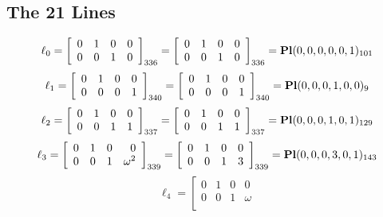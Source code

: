\documentclass{article}
\begin{document}
{\subsection*{The 21 Lines}
$$
\ell_{0} = 
\left[
\begin{array}{*{4}{r}}
0 & 1 & 0 & 0\\
0 & 0 & 1 & 0\\
\end{array}
\right]
_{336}
=
\left[
\begin{array}{*{4}c}
0  & 1  & 0  & 0\\
0  & 0  & 1  & 0\\
\end{array}
\right]_{336}
={\rm\bf Pl}(0,0,0,0,0,1 )_{101}$$
$$
\ell_{1} = 
\left[
\begin{array}{*{4}{r}}
0 & 1 & 0 & 0\\
0 & 0 & 0 & 1\\
\end{array}
\right]
_{340}
=
\left[
\begin{array}{*{4}c}
0  & 1  & 0  & 0\\
0  & 0  & 0  & 1\\
\end{array}
\right]_{340}
={\rm\bf Pl}(0,0,0,1,0,0 )_{9}$$
$$
\ell_{2} = 
\left[
\begin{array}{*{4}{r}}
0 & 1 & 0 & 0\\
0 & 0 & 1 & 1\\
\end{array}
\right]
_{337}
=
\left[
\begin{array}{*{4}c}
0  & 1  & 0  & 0\\
0  & 0  & 1  & 1\\
\end{array}
\right]_{337}
={\rm\bf Pl}(0,0,0,1,0,1 )_{129}$$
$$
\ell_{3} = 
\left[
\begin{array}{*{4}{r}}
0 & 1 & 0 & 0\\
0 & 0 & 1 & \omega^{2}\\
\end{array}
\right]
_{339}
=
\left[
\begin{array}{*{4}c}
0  & 1  & 0  & 0\\
0  & 0  & 1  & 3\\
\end{array}
\right]_{339}
={\rm\bf Pl}(0,0,0,3,0,1 )_{143}$$
$$
\ell_{4} = 
\left[
\begin{array}{*{4}{r}}
0 & 1 & 0 & 0\\
0 & 0 & 1 & \omega \\

\end{array}$$}
\end{document}
